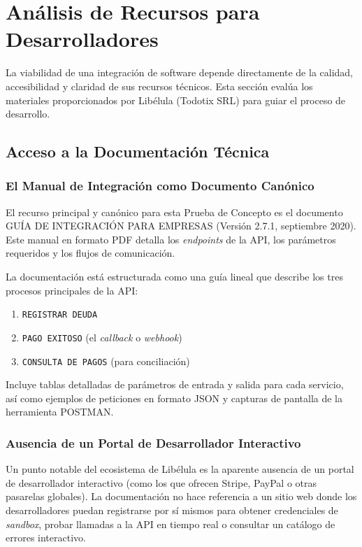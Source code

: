 \section{Análisis de Recursos para Desarrolladores}
    La viabilidad de una integración de software depende directamente de la calidad, accesibilidad y claridad de sus recursos 
    técnicos. Esta sección evalúa los materiales proporcionados por Libélula (Todotix SRL) para guiar el proceso de desarrollo.\par

    \subsection{Acceso a la Documentación Técnica}
        \subsubsection{El Manual de Integración como Documento Canónico}
            El recurso principal y canónico para esta Prueba de Concepto es el documento GUÍA DE INTEGRACIÓN PARA EMPRESAS
            (Versión 2.7.1, septiembre 2020). Este manual en formato PDF detalla los \emph{endpoints} de la API, 
            los parámetros requeridos y los flujos de comunicación.\par      
            
            La documentación está estructurada como una guía lineal que describe los tres procesos principales de la API:\par
        \begin{enumerate}
            \item \texttt{REGISTRAR DEUDA}
            \item \texttt{PAGO EXITOSO} (el \emph{callback} o \emph{webhook})
            \item \texttt{CONSULTA DE PAGOS} (para conciliación)
        \end{enumerate}
            Incluye tablas detalladas de parámetros de entrada y salida para cada servicio, así como ejemplos de peticiones en 
            formato JSON y capturas de pantalla de la herramienta POSTMAN.\par

        \subsubsection{Ausencia de un Portal de Desarrollador Interactivo}
            Un punto notable del ecosistema de Libélula es la aparente ausencia de un portal de desarrollador interactivo (como 
            los que ofrecen Stripe, PayPal o otras pasarelas globales). La documentación no hace referencia a un sitio web donde 
            los desarrolladores puedan registrarse por sí mismos para obtener credenciales de \emph{sandbox}, probar llamadas a 
            la API en tiempo real o consultar un catálogo de errores interactivo.\par

